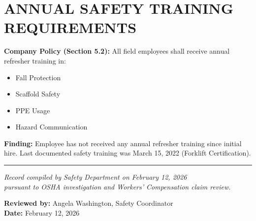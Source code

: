 \documentclass[11pt]{article}
\begin{document}
\section*{ANNUAL SAFETY TRAINING REQUIREMENTS}

\textbf{Company Policy (Section 5.2):} All field employees shall receive annual refresher training in:
\begin{itemize}[nosep]
\item Fall Protection
\item Scaffold Safety
\item PPE Usage
\item Hazard Communication
\end{itemize}

\textbf{\color{warningred} Finding:} Employee has not received any annual refresher training since initial hire. Last documented safety training was March 15, 2022 (Forklift Certification).

\vspace{2em}

\hrule

\vspace{1em}

\begin{center}
\small\textit{Record compiled by Safety Department on February 12, 2026\\
pursuant to OSHA investigation and Workers' Compensation claim review.}

\vspace{1em}

\textbf{Reviewed by:} Angela Washington, Safety Coordinator\\
\textbf{Date:} February 12, 2026
\end{center}
\end{document}
